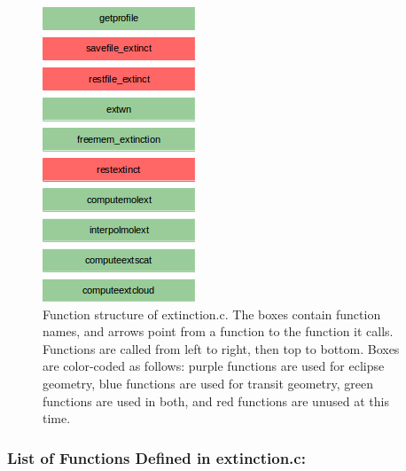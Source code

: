 \documentclass[letterpaper,12pt]{article}
\begin{document}
\begin{figure}
\includegraphics{fig/extinctionc}
\caption{Function structure of extinction.c. The boxes contain function names, and arrows point from a function to the function it calls. Functions are called from left to right, then top to bottom.  Boxes are color-coded as follows:  purple functions are used for eclipse geometry, blue functions are used for transit geometry, green functions are used in both, and red functions are unused at this time.}
\label{fig:extinctionc}
\end{figure}

\subsubsection{ List of Functions Defined in extinction.c:}
 \\

 \newline

 \\

 \\
\end{document}
